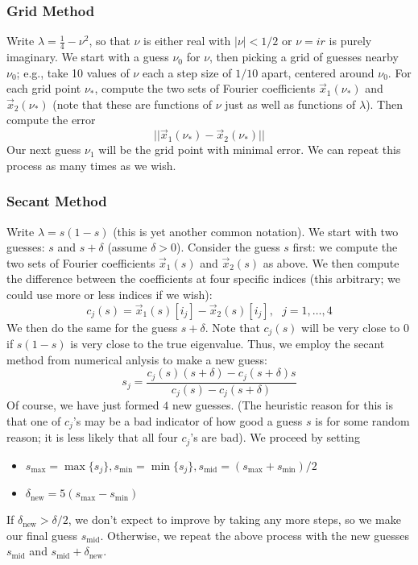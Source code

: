 \documentclass[]{article}
\begin{document}
\subsubsection*{Grid Method}

Write $\lambda = \frac{1}{4} - \nu^2$, so that $\nu$ is either real with $|\nu| < 1/2$ or $\nu = ir$ is purely imaginary.
We start with a guess $\nu_0$ for $\nu$, then picking a grid of guesses nearby $\nu_0$; e.g., take 10 values of $\nu$ each a step size of $1/10$ apart, centered around $\nu_0$.
For each grid point $\nu_*$, compute the two sets of Fourier coefficients $\vec{x}_1(\nu_*)$ and $\vec{x}_2(\nu_*)$ (note that these are functions of $\nu$ just as well as functions of $\lambda$).
Then compute the error
$$
||\vec{x}_1(\nu_*) - \vec{x}_2(\nu_*)||
$$
Our next guess $\nu_1$ will be the grid point with minimal error.
We can repeat this process as many times as we wish.

\subsubsection*{Secant Method}

Write $\lambda = s(1 - s)$ (this is yet another common notation).
We start with two guesses: $s$ and $s + \delta$ (assume $\delta > 0$).
Consider the guess $s$ first: we compute the two sets of Fourier coefficients $\vec{x}_1(s)$ and $\vec{x}_2(s)$ as above.
We then compute the difference between the coefficients at four specific indices (this arbitrary; we could use more or less indices if we wish):
$$
c_j(s) = \vec{x}_1(s)[i_j] - \vec{x}_2(s)[i_j], ~~~ j = 1, \dots, 4
$$
We then do the same for the guess $s + \delta$.
Note that $c_j(s)$ will be very close to $0$ if $s(1 - s)$ is very close to the true eigenvalue.
Thus, we employ the secant method from numerical anlysis to make a new guess:
$$
s_j = \frac{c_j(s)(s + \delta) - c_j(s + \delta)s}{c_j(s) - c_j(s + \delta)}
$$
Of course, we have just formed $4$ new guesses. (The heuristic reason for this is that one of $c_j$'s may be a bad indicator of how good a guess $s$ is for some random reason; it is less likely that all four $c_j$'s are bad).
We proceed by setting
\begin{itemize}
	\item $s_{\text{max}} = \max\{s_j\}, s_{\text{min}} = \min\{s_j\}, s_{\text{mid}} = (s_{\text{max}} + s_{\text{min}})/2$
	\item $\delta_{\text{new}} = 5(s_{\text{max}} - s_{\text{min}})$
\end{itemize}
If $\delta_{\text{new}} > \delta/2$, we don't expect to improve by taking any more steps, so we make our final guess $s_{\text{mid}}$.
Otherwise, we repeat the above process with the new guesses $s_{\text{mid}}$ and $s_{\text{mid}} + \delta_{\text{new}}$.
\end{document}
